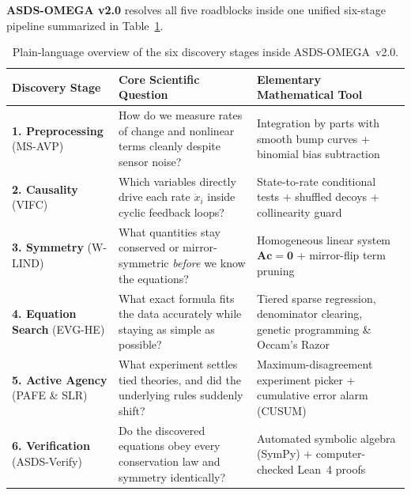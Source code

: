\documentclass[11pt,a4paper]{article}
\begin{document}
\textbf{ASDS-OMEGA v2.0} resolves all five roadblocks inside one unified six-stage pipeline summarized in Table~\ref{tab:pipeline_overview}.

\begin{table}[!htbp]
\centering
\caption{Plain-language overview of the six discovery stages inside ASDS-OMEGA~v2.0.}
\label{tab:pipeline_overview}
\small
\begin{tabular}{@{}>{\raggedright\arraybackslash}p{} >{\raggedright\arraybackslash}p{} >{\raggedright\arraybackslash}p{}@{}}
\toprule
\textbf{Discovery Stage} & \textbf{Core Scientific Question} & \textbf{Elementary Mathematical Tool} \\
\midrule
\textbf{1. Preprocessing} \newline (MS-AVP) & How do we measure rates of change and nonlinear terms cleanly despite sensor noise? & Integration by parts with smooth bump curves + binomial bias subtraction \\
\addlinespace[0.4em]
\textbf{2. Causality} \newline (VIFC) & Which variables directly drive each rate $\dot{x}_i$ inside cyclic feedback loops? & State-to-rate conditional tests + shuffled decoys + collinearity guard \\
\addlinespace[0.4em]
\textbf{3. Symmetry} \newline (W-LIND) & What quantities stay conserved or mirror-symmetric \emph{before} we know the equations? & Homogeneous linear system $\mathbf{A}\mathbf{c}=\mathbf{0}$ + mirror-flip term pruning \\
\addlinespace[0.4em]
\textbf{4. Equation Search} \newline (EVG-HE) & What exact formula fits the data accurately while staying as simple as possible? & Tiered sparse regression, denominator clearing, genetic programming \& Occam's Razor \\
\addlinespace[0.4em]
\textbf{5. Active Agency} \newline (PAFE \& SLR) & What experiment settles tied theories, and did the underlying rules suddenly shift? & Maximum-disagreement experiment picker + cumulative error alarm (CUSUM) \\
\addlinespace[0.4em]
\textbf{6. Verification} \newline (ASDS-Verify) & Do the discovered equations obey every conservation law and symmetry identically? & Automated symbolic algebra (SymPy) + computer-checked Lean~4 proofs \\
\bottomrule
\end{tabular}
\end{table}
\end{document}
